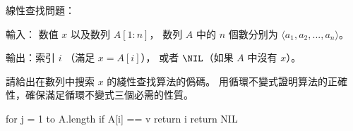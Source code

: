 線性查找問題：

輸入： 数值 $x$ 以及数列 $A[1:n]$，
数列 $A$ 中的 $n$ 個數分别为 $\langle a_1, a_2, ..., a_n \rangle$。

輸出：索引 $i$ （滿足 $x = A[i]$），
或者 $\NIL$（如果 $A$ 中沒有 $x$）。

請給出在數列中搜索 $x$ 的綫性查找算法的僞碼。
用循環不變式證明算法的正確性，確保滿足循環不變式三個必需的性質。
\stopEXERCISE

\startANSWER
\startCLRSCODE
for j = 1 to A.length
	if A[i] == v
		return i
return NIL
\stopCLRSCODE
\stopANSWER
